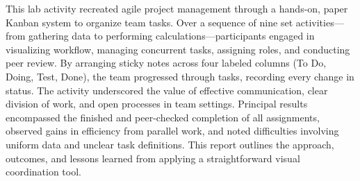 This lab activity recreated agile project management through a hands-on, paper Kanban system to organize team tasks. Over a sequence of nine set activities—from gathering data to performing calculations—participants engaged in visualizing workflow, managing concurrent tasks, assigning roles, and conducting peer review. By arranging sticky notes across four labeled columns (To Do, Doing, Test, Done), the team progressed through tasks, recording every change in status. The activity underscored the value of effective communication, clear division of work, and open processes in team settings. Principal results encompassed the finished and peer-checked completion of all assignments, observed gains in efficiency from parallel work, and noted difficulties involving uniform data and unclear task definitions. This report outlines the approach, outcomes, and lessons learned from applying a straightforward visual coordination tool.
\endinput
